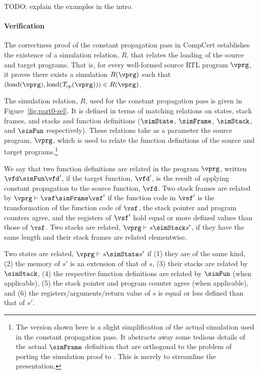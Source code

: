 TODO: explain the examples in the intro.



\paragraph{Verification}

The correctness proof of the constant propagation pass in CompCert establishes 
the existence of a simulation relation, $R$, that relates the loading of the source and target programs.
That is, for every well-formed source RTL program $\vprg$, it proves 
there exists a simulation $R(\vprg)$ such that 
$(\mathrm{load}(\vprg),\mathrm{load}(\mathcal{T}_\mathrm{cp}(\vprg)))\in R(\vprg)$.

The simulation relation, $R$, used for the constant propagation pass
is given in Figure~\ref{fig:part0-rel}.  It is defined in terms of
matching relations on states, stack frames, and stacks and function
definitions ($\simState$, $\simFrame$, $\simStack$, and $\simFun$
respectively).  These relations take as a parameter the source
program, $\vprg$, which is used to relate the function definitions of
the source and target programs.\footnote{The version shown here is a
  slight simplification of the actual simulation used in the constant
  propagation pass.  It abstracts away some tedious details of the
  actual $\simFrame$ definition that are orthogonal to the problem of
  porting the simulation proof to \sepcomp{}.  This is merely to
  streamline the presentation.}

We say that two function definitions are related in the program $\vprg$, written $\vfd \simFun \vfd'$, 
if the target function, $\vfd'$, is the result of applying constant propagation to the source function, $\vfd$.
Two stack frames are related by $\vprg \vdash \vsf\simFrame \vsf'$ if 
the function code in $\vsf'$ is the transformation of the function code of $\vsf$,
the stack pointer and program counters agree, and
the registers of $\vsf'$ hold equal or more defined values than those of $\vsf$.
Two stacks are related, $\vprg \vdash s\simStack s'$, if they have the same length and their stack frames are related elementwise.

% 

Two states are related, $\vprg \vdash s \simState s'$
if (1) they are of the same kind, 
(2) the memory of $s'$ is an extension of that of $s$, 
(3) their stacks are related by $\simStack$,
(4) the respective function definitions are related by $\simFun$ (when applicable),
(5) the stack pointer and program counter agree (when applicable), and
(6) the registers/arguments/return value of $s$ is equal or less defined than that of $s'$. 

